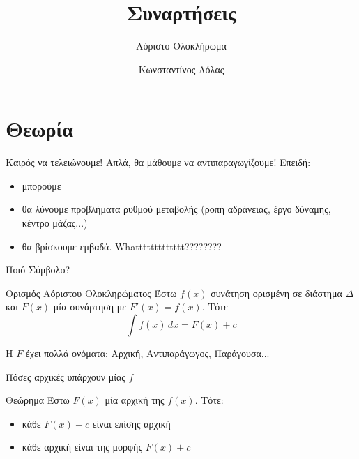 \documentclass{presentation}
\title{Συναρτήσεις}
\subtitle{Αόριστο Ολοκλήρωμα}
\author[Λόλας]{Κωνσταντίνος Λόλας}
\institute[$10^ο$ ΓΕΛ]{$10^ο$ ΓΕΛ Θεσσαλονίκης}
\date{}
\begin{document}
\begin{frame}
    \titlepage
\end{frame}

\section{Θεωρία}
\begin{frame}{Καιρός να τελειώνουμε!}
    Απλά, θα μάθουμε να αντιπαραγωγίζουμε! Επειδή:
    \begin{itemize}[<+->]
        \item μπορούμε
        \item θα λύνουμε προβλήματα ρυθμού μεταβολής (ροπή αδράνειας, έργο δύναμης, κέντρο μάζας...)
        \item θα βρίσκουμε εμβαδά. Whattttttttttttt????????
    \end{itemize}
\end{frame}

\begin{frame}{Ποιό Σύμβολο?}
    \begin{block}{Ορισμός Αόριστου Ολοκληρώματος}
        Έστω $f(x)$ συνάτηση ορισμένη σε διάστημα $Δ$ και $F(x)$ μία συνάρτηση με $F'(x)=f(x)$. Τότε
        $$\int f(x) \, dx=F(x)+c$$
    \end{block}
    H $F$ έχει πολλά ονόματα: Αρχική, Αντιπαράγωγος, Παράγουσα...
\end{frame}

\begin{frame}{Πόσες αρχικές υπάρχουν μίας $f$}
    \begin{block}{Θεώρημα}
        Έστω $F(x)$ μία αρχική της $f(x)$. Τότε:
        \begin{itemize}
            \item κάθε $F(x)+c$ είναι επίσης αρχική
            \item κάθε αρχική είναι της μορφής $F(x)+c$
        \end{itemize}
    \end{block}
\end{frame}
\end{document}
